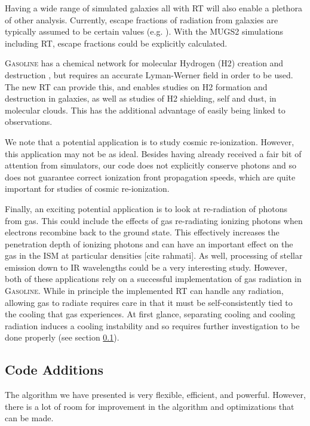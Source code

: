Having a wide range of simulated galaxies all with RT will also enable a plethora of other analysis. Currently, escape fractions of radiation from galaxies are typically assumed to be certain values (e.g. \citet{kannanEt14}). With the MUGS2 simulations including RT, escape fractions could be explicitly calculated.

\textsc{Gasoline} has a chemical network for molecular Hydrogen (H2) creation and destruction \citep{christensenEt12}, but requires an accurate Lyman-Werner field in order to be used. The new RT can provide this, and enables studies on H2 formation and destruction in galaxies, as well as studies of H2 shielding, self and dust, in molecular clouds. This has the additional advantage of easily being linked to observations.

We note that a potential application is to study cosmic re-ionization. However, this application may not be as ideal. Besides having already received a fair bit of attention from simulators, our code does not explicitly conserve photons and so does not guarantee correct ionization front propagation speeds, which are quite important for studies of cosmic re-ionization.

Finally, an exciting potential application is to look at re-radiation of photons from gas. This could include the effects of gas re-radiating ionizing photons when electrons recombine back to the ground state. This effectively increases the penetration depth of ionizing photons and can have an important effect on the gas in the ISM at particular densities [cite rahmati]. As well, processing of stellar emission down to IR wavelengths could be a very interesting study. However, both of these applications rely on a successful implementation of gas radiation in \textsc{Gasoline}. While in principle the implemented RT can handle any radiation, allowing gas to radiate requires care in that it must be self-consistently tied to the cooling that gas experiences. At first glance, separating cooling and cooling radiation induces a cooling instability and so requires further investigation to be done properly (see section \ref{sec:codeadditions}).

\subsection{Code Additions}
\label{sec:codeadditions}

The algorithm we have presented is very flexible, efficient, and powerful. However, there is a lot of room for improvement in the algorithm and optimizations that can be made.

